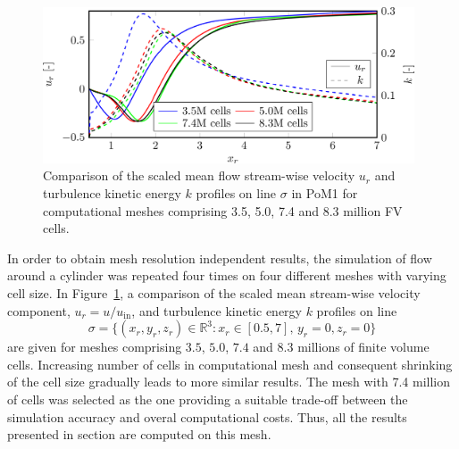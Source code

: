 \begin{figure}[htbp]
    \centering
    \includegraphics[width=0.98\textwidth]{02_images/00_export/figure3.png}
    \caption{Comparison of the scaled mean flow stream-wise velocity $u_r$ and turbulence kinetic energy $k$ profiles on line $\sigma$ in PoM1 for computational meshes comprising 3.5, 5.0, 7.4 and 8.3 million FV cells.}
    \label{fig:meshIndep}
\end{figure}
In order to obtain mesh resolution independent results, the simulation of flow around a cylinder was repeated four times on four different meshes with varying cell size. In Figure~\ref{fig:meshIndep}, a comparison of the {scaled} mean stream-wise velocity component, $u_r = u/u_{\mathrm{in}}$, and turbulence kinetic energy $k$ profiles on line
\begin{equation}
    {\sigma = \{(x_r,y_r,z_r)\in\mathbb{R}^{3}:x_r\in [0.5,7],\,y_r = 0,z_r=0\}}
\end{equation}
are given for meshes comprising $3.5$, $5.0$, $7.4$ and $8.3$ million{s of} finite volume cells. Increasing number of cells in computational mesh and consequent shrinking of the cell size gradually leads to more similar results. {The mesh with 7.4 million of cells was selected as the one providing a suitable trade-off between the simulation accuracy and overal computational costs. Thus, } all the results presented in  section are computed on {this mesh}.




